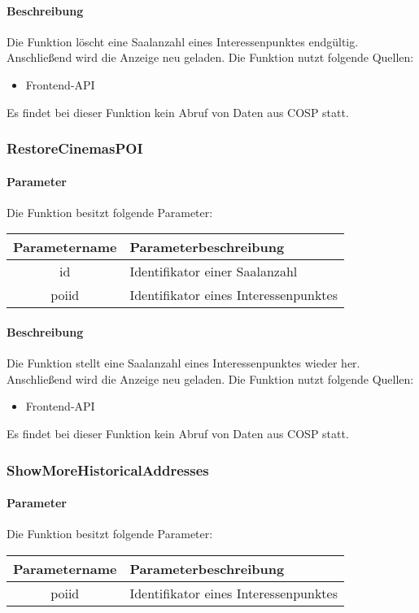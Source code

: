\paragraph{Beschreibung} Die Funktion löscht eine Saalanzahl eines Interessenpunktes endgültig. Anschließend wird die Anzeige neu geladen. Die Funktion nutzt folgende Quellen:
\begin{itemize}
	\item Frontend-API
\end{itemize}
Es findet bei dieser Funktion kein Abruf von Daten aus {\glqq COSP\grqq} statt.
\subsubsection{RestoreCinemasPOI}
\paragraph{Parameter} Die Funktion besitzt folgende Parameter:
\begin{table}[H]
	\begin{tabular}{|c|p{11cm}|}
		\hline
		\textbf{Parametername} & \textbf{Parameterbeschreibung} \\ \hline
		id    & Identifikator einer Saalanzahl \\ \hline
		poiid & Identifikator eines Interessenpunktes \\ \hline
	\end{tabular}
\end{table}
\paragraph{Beschreibung} Die Funktion stellt eine Saalanzahl eines Interessenpunktes wieder her. Anschließend wird die Anzeige neu geladen. Die Funktion nutzt folgende Quellen:
\begin{itemize}
	\item Frontend-API
\end{itemize}
Es findet bei dieser Funktion kein Abruf von Daten aus {\glqq COSP\grqq} statt.
\subsubsection{ShowMoreHistoricalAddresses}
\paragraph{Parameter} Die Funktion besitzt folgende Parameter:
\begin{table}[H]
	\begin{tabular}{|c|p{11cm}|}
		\hline
		\textbf{Parametername} & \textbf{Parameterbeschreibung} \\ \hline
		poiid & Identifikator eines Interessenpunktes \\ \hline
	\end{tabular}
\end{table}
